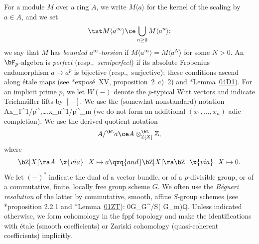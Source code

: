 For a module $M$ over a ring $A$, we write $M\langle a \rangle$ for the kernel of the scaling by $a \in A$, and we set
\[
\tst M\langle a^\infty \rangle \ce \bigcup_{n \ge 0} M\langle a^n\rangle;
\]
we say that $M$ has \emph{bounded $a^\infty$-torsion} if $M\langle a^\infty\rangle = M\langle a^N\rangle $ for some  $N > 0$. %
An $\bF_p$-algebra is \emph{perfect} (resp.,~\emph{semiperfect}) if its absolute Frobenius endomorphism $a \mapsto a^p$ is bijective (resp.,~surjective); these conditions ascend along \'{e}tale maps (see \cite{SGA5}*{expos\'{e}~XV, proposition~2~c)~2)} and \cite{SP}*{Lemma~\href{https://stacks.math.columbia.edu/tag/04D1}{04D1}}). For an implicit prime $p$, we let $W(-)$ denote the $p$-typical Witt vectors and  indicate Teichm\"{u}ller lifts by $[-]$. We use the (somewhat nonstandard) notation
\be {}
\tst A\llb x_1^{1/p^\infty},\ldots,x_n^{1/p^\infty}\rrb \ce \varinjlim_m 
\ee
(we do not form an additional $(x_1,\ldots,x_n)$-adic completion). We use the derived quotient notation
\[
A/^\bL a \ce A\otimes^\bL_{\mathbb Z[X]} \mathbb Z,
\]
where
\[
\bZ[X] \ra A \ \ \x{via}\ \ X \mapsto a \qxq{and} \bZ[X] \ra \bZ \ \ \x{via}\ \ X \mapsto 0.
\]
We let $(-)^*$ indicate the dual of a vector bundle, or of a $p$-divisible group, or of a commutative, finite, locally free group scheme $G$.
  We often use the \emph{B\'{e}gueri resolution} of the latter by commutative, smooth, affine $S$-group schemes (see \cite{Beg80}*{proposition 2.2.1} and \cite{SP}*{Lemma~\href{http://stacks.math.columbia.edu/tag/01ZT}{01ZT}}):
\be \label{Begueri-0}
0\to G\to {}_{G^\ast/S}( \mathbb G_m)\to Q.
\ee
Unless indicated otherwise, we form cohomology in the fppf topology and make the identifications with \'{e}tale (smooth coefficients) or Zariski cohomology (quasi-coherent coefficients) implicitly.

